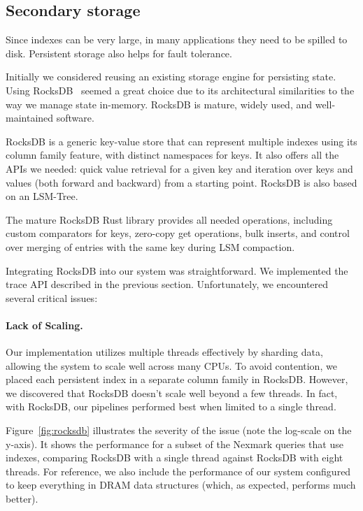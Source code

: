 \subsection{Secondary storage}

Since indexes can be very large, in many applications they need to be
spilled to disk.  Persistent storage also helps for fault tolerance.

Initially we considered reusing an existing storage engine for
persisting state.  Using RocksDB~\cite{dong-ats21} seemed a great
choice due to its architectural similarities to the way we manage state
in-memory.  RocksDB is mature, widely used, and well-maintained
software.

RocksDB is a generic key-value store that can represent multiple
indexes using its column family feature, with distinct namespaces for
keys. It also offers all the APIs we needed: quick value retrieval for
a given key and iteration over keys and values (both forward and
backward) from a starting point.  RocksDB is also based on an
LSM-Tree.

The mature RocksDB Rust library provides all needed operations,
including custom comparators for keys, zero-copy get operations, bulk
inserts, and control over merging of entries with the same key during
LSM compaction.

Integrating RocksDB into our system was straightforward.  We
implemented the trace API described in the previous section.
Unfortunately, we encountered several critical issues:

\paragraph{Lack of Scaling.} Our implementation utilizes multiple threads
effectively by sharding data, allowing the system to scale well across
many CPUs.  To avoid contention, we placed each persistent index in a
separate column family in RocksDB. However, we discovered that RocksDB
doesn't scale well beyond a few threads. In fact, with RocksDB, our
pipelines performed best when limited to a single thread.

Figure~\ref{fig:rocksdb} illustrates the severity of the issue (note
the log-scale on the y-axis). It shows the performance for a subset of
the Nexmark queries that use indexes, comparing RocksDB with a single
thread against RocksDB with eight threads. For reference, we also
include the performance of our system configured to keep everything in
DRAM data structures (which, as expected, performs much better).

